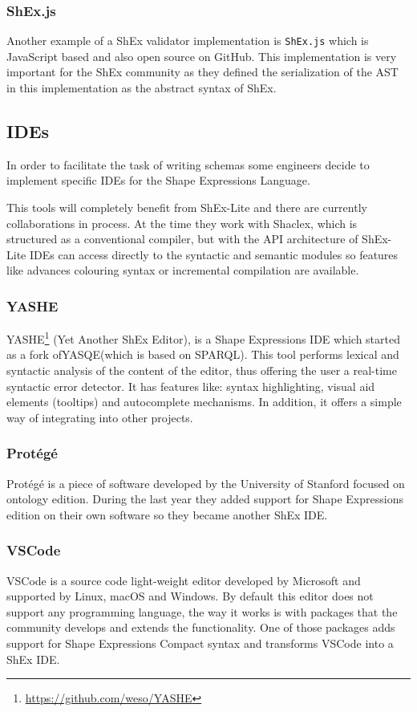 \subsubsection{ShEx.js}
Another example of a ShEx validator implementation is \texttt{ShEx.js} which is JavaScript based and also
open source on GitHub. This implementation is very important for the ShEx community as they defined the
serialization of the AST in this implementation as the abstract syntax of ShEx.


\subsection{IDEs}
In order to facilitate the task of writing schemas some engineers decide to implement specific IDEs for the
Shape Expressions Language.

This tools will completely benefit from ShEx-Lite and there are currently collaborations in process. At the
time they work with Shaclex, which is structured as a conventional compiler, but with the API architecture
of ShEx-Lite IDEs can access directly to the syntactic and semantic modules so features like advances colouring
syntax or incremental compilation are available.

\subsubsection{YASHE}
YASHE\footnote{\url{https://github.com/weso/YASHE}} (Yet Another ShEx Editor), is a Shape Expressions IDE
which started as a fork ofYASQE(which is based on SPARQL). This tool performs lexical and syntactic analysis
of the content of the editor, thus offering the user a real-time syntactic error detector. It has features
like: syntax highlighting, visual aid elements (tooltips) and autocomplete mechanisms. In addition, it offers
a simple way of integrating into other projects.

\subsubsection{Protégé}
Protégé is a piece of software developed by the University of Stanford focused on ontology edition. During the
last year they added support for Shape Expressions edition on their own software so they became another ShEx IDE.

\subsubsection{VSCode}
VSCode is a source code light-weight editor developed by Microsoft and supported by Linux, macOS and Windows.
By default this editor does not support any programming language, the way it works is with packages that the
community develops and extends the functionality. One of those packages adds support for Shape Expressions
Compact syntax and transforms VSCode into a ShEx IDE.

